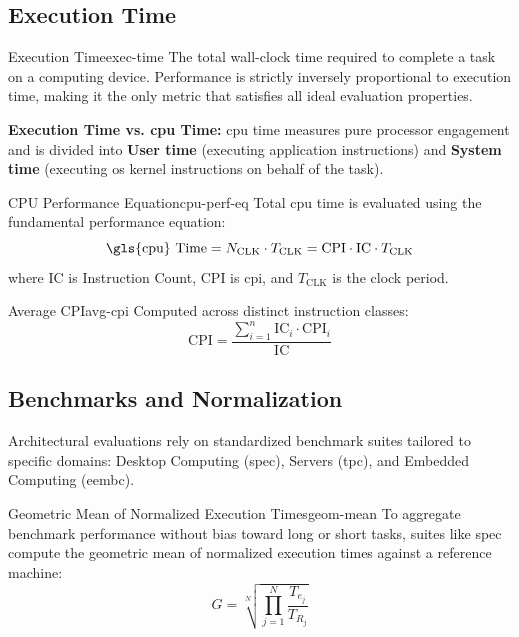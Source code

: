 \subsection{Execution Time}
\begin{definition}{Execution Time}{exec-time}
    The total wall-clock time required to complete a task on a computing device. Performance is strictly inversely proportional to execution time, making it the only metric that satisfies all ideal evaluation properties.
\end{definition}

\noindent \textbf{Execution Time vs. \gls{cpu} Time:} \gls{cpu} time measures pure processor engagement and is divided into \textbf{User time} (executing application instructions) and \textbf{System time} (executing \gls{os} kernel instructions on behalf of the task).

\begin{definition}{CPU Performance Equation}{cpu-perf-eq}
    Total \gls{cpu} time is evaluated using the fundamental performance equation:
    \[
        \text{\gls{cpu} Time} = N_{\text{CLK}} \cdot T_{\text{CLK}} = \text{CPI} \cdot \text{IC} \cdot T_{\text{CLK}}
    \]
    where \(\text{IC}\) is Instruction Count, \(\text{CPI}\) is \gls{cpi}, and \(T_{\text{CLK}}\) is the clock period.
\end{definition}

\begin{definition}{Average CPI}{avg-cpi}
    Computed across distinct instruction classes:
    \[
        \text{CPI} = \frac{\sum_{i=1}^n \text{IC}_i \cdot \text{CPI}_i}{\text{IC}}
    \]
\end{definition}

\subsection{Benchmarks and Normalization}
Architectural evaluations rely on standardized benchmark suites tailored to specific domains: Desktop Computing (\gls{spec}), Servers (\gls{tpc}), and Embedded Computing (\gls{eembc}).

\begin{definition}{Geometric Mean of Normalized Execution Times}{geom-mean}
    To aggregate benchmark performance without bias toward long or short tasks, suites like \gls{spec} compute the geometric mean of normalized execution times against a reference machine:
    \[
        G = \sqrt[N]{\prod_{j=1}^N \frac{T_{e_j}}{T_{R_j}}}
    \]
\end{definition}

